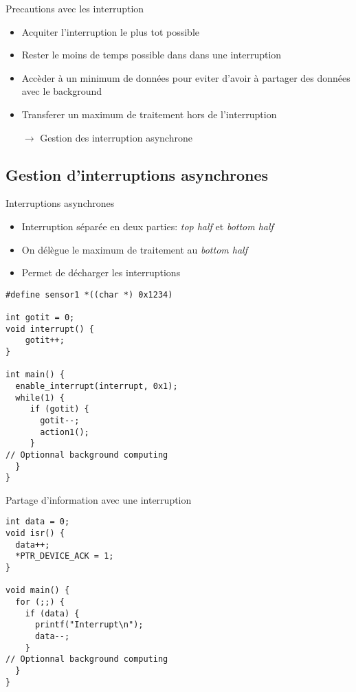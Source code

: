 \begin{frame}{Precautions avec les interruption}
  \begin{itemize} 
  \item Acquiter l'interruption le plus tot possible
  \item Rester le moins de temps possible dans dans une interruption
  \item Accèder à un minimum de données pour eviter d'avoir à partager
    des données avec le background
  \item Transferer un maximum de traitement hors de l'interruption
  \item[$\rightarrow$] Gestion des interruption asynchrone
  \end{itemize} 
\end{frame} 

\subsection{Gestion d'interruptions asynchrones} 

\begin{frame}[fragile]{Interruptions asynchrones}
  \begin{itemize} 
  \item Interruption séparée en deux parties: \emph{top half} et \emph{bottom half}
  \item On délègue le maximum de traitement au \emph{bottom half}
  \item Permet de décharger les interruptions
  \end{itemize}
  \begin{lstlisting} 
#define sensor1 *((char *) 0x1234)

int gotit = 0;
void interrupt() {
    gotit++;
}

int main() {
  enable_interrupt(interrupt, 0x1);
  while(1) {
     if (gotit) {
       gotit--;
       action1();
     }
// Optionnal background computing 
  }
}
  \end{lstlisting} 
\end{frame} 

\begin{frame}[fragile]{Partage d'information avec une interruption}
  \begin{lstlisting} 
int data = 0;
void isr() {
  data++;
  *PTR_DEVICE_ACK = 1;
}

void main() {
  for (;;) {
    if (data) {
      printf("Interrupt\n");
      data--;
    }
// Optionnal background computing 
  }
}
  \end{lstlisting} 
\end{frame} 

